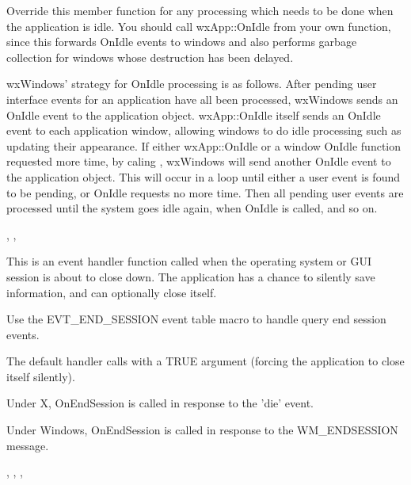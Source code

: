 
Override this member function for any processing which needs to be done
when the application is idle. You should call wxApp::OnIdle from your own function,
since this forwards OnIdle events to windows and also performs garbage collection for
windows whose destruction has been delayed.

wxWindows' strategy for OnIdle processing is as follows. After pending user interface events for an
application have all been processed, wxWindows sends an OnIdle event to the application object. wxApp::OnIdle itself
sends an OnIdle event to each application window, allowing windows to do idle processing such as updating
their appearance. If either wxApp::OnIdle or a window OnIdle function requested more time, by
caling , wxWindows will send another OnIdle
event to the application object. This will occur in a loop until either a user event is found to be
pending, or OnIdle requests no more time. Then all pending user events are processed until the system
goes idle again, when OnIdle is called, and so on.


, ,\rtfsp
{}

\label{wxapponendsession}


This is an event handler function called when the operating system or GUI session is
about to close down. The application has a chance to silently save information,
and can optionally close itself.

Use the EVT\_END\_SESSION event table macro to handle query end session events.

The default handler calls  with a TRUE argument
(forcing the application to close itself silently).


Under X, OnEndSession is called in response to the 'die' event.

Under Windows, OnEndSession is called in response to the WM\_ENDSESSION message.


,\rtfsp
{},\rtfsp
{},\rtfsp
{}

